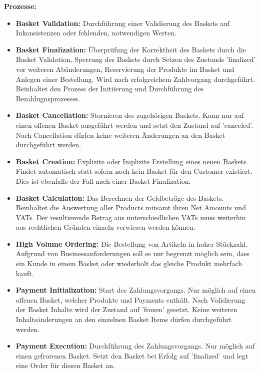 {\large \textbf{Prozesse:}}
\begin{itemize}[]
	\item \textbf{Basket Validation: } {Durchführung einer Validierung des Baskets auf Inkonsistenzen oder fehlenden, notwendigen Werten.}
	\item \textbf{Basket Finalization: } {Überprüfung der Korrektheit des Baskets durch die Basket Validation, Sperrung des Baskets durch Setzen des Zustands 'finalized' vor weiteren Abänderungen, Reservierung der Produkte im Basket und Anlegen einer Bestellung. Wird nach erfolgreichem Zahlvorgang durchgeführt. Beinhaltet den Prozess der Initiierung und Durchführung des Bezahlugnsprozesses.}
	\item \textbf{Basket Cancellation: } {Stornieren des zugehörigen Baskets. Kann nur auf einen offenen Basket ausgeführt werden und setzt den Zustand auf 'canceled'. Nach Cancellation dürfen keine weiteren Änderungen an den Basket durchgeführt werden. }
	\item \textbf{Basket Creation: } {Explizite oder Implizite Erstellung eines neuen Baskets. Findet automatisch statt sofern noch kein Basket für den Customer existiert. Dies ist ebenfalls der Fall nach einer Basket Finalization.}
	\item \textbf{Basket Calculation: } {Das Berechnen der Geldbeträge des Baskets. Beinhaltet die Auswertung aller Products mitsamt ihren Net Amounts und VATs. Der resultierende Betrag aus unterschiedlichen VATs muss weiterhin aus rechtlichen Gründen einzeln verwiesen werden können.}
	\item \textbf{High Volume Ordering: } {Die Bestellung von Artikeln in hoher Stückzahl. Aufgrund von Businessanforderungen soll es nur begrenzt möglich sein, dass ein Kunde in einem Basket oder wiederholt das gleiche Produkt mehrfach kauft.}
	\item \textbf{Payment Initialization: } {Start des Zahlungsvorgangs. Nur möglich auf einen offenen Basket, welcher Produkte und Payments enthält. Nach Validierung der Basket Inhalte wird der Zustand auf 'frozen' gesetzt. Keine weiteren Inhaltsänderungen an den einzelnen Basket Items dürfen durchgeführt werden.}
	\item \textbf{Payment Execution: } {Durchführung des Zahlungsvorgangs. Nur möglich auf einen gefrorenen Basket. Setzt den Basket bei Erfolg auf 'finalized' und legt eine Order für diesen Basket an.}
\end{itemize}
\vspace{0.4em}

